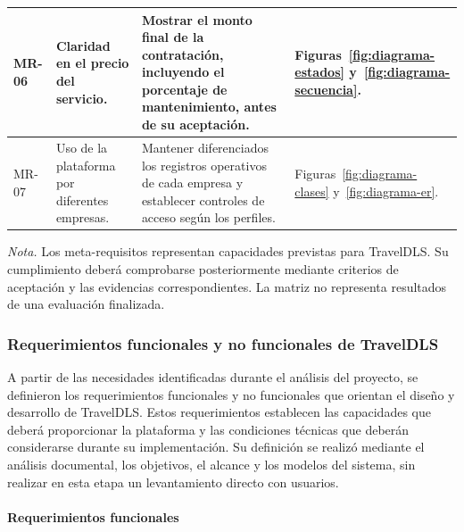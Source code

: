 \begin{table}[H]
\begin{tabularx}{\textwidth}{
			@{}
			>{\RaggedRight\arraybackslash}p{1.35cm}
			>{\RaggedRight\arraybackslash}p{3.05cm}
			>{\RaggedRight\arraybackslash}X
			>{\RaggedRight\arraybackslash}p{2.85cm}
			@{}
		}
		\midrule

		MR-06 &
		Claridad en el precio del servicio. &
		Mostrar el monto final de la contratación, incluyendo el porcentaje de mantenimiento, antes de su aceptación. &
		Figuras~\ref{fig:diagrama-estados} y~\ref{fig:diagrama-secuencia}. \\

		\midrule

		MR-07 &
		Uso de la plataforma por diferentes empresas. &
		Mantener diferenciados los registros operativos de cada empresa y establecer controles de acceso según los perfiles. &
		Figuras~\ref{fig:diagrama-clases} y~\ref{fig:diagrama-er}. \\

		\bottomrule

	\end{tabularx}

	\vspace{0.2cm}

	\begin{minipage}{\textwidth}
		\footnotesize
		\textit{Nota.} Los meta-requisitos representan capacidades
		previstas para TravelDLS. Su cumplimiento deberá comprobarse
		posteriormente mediante criterios de aceptación y las
		evidencias correspondientes. La matriz no representa
		resultados de una evaluación finalizada.
	\end{minipage}

\end{table}

\subsubsection{Requerimientos funcionales y no funcionales de TravelDLS}

A partir de las necesidades identificadas durante el análisis del proyecto, se definieron los requerimientos funcionales y no funcionales que orientan el diseño y desarrollo de TravelDLS. Estos requerimientos establecen las capacidades que deberá proporcionar la plataforma y las condiciones técnicas que deberán considerarse durante su implementación. Su definición se realizó mediante el análisis documental, los objetivos, el alcance y los modelos del sistema, sin realizar en esta etapa un levantamiento directo con usuarios.

\paragraph{Requerimientos funcionales}

